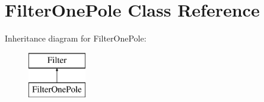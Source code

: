 \hypertarget{class_filter_one_pole}{\section{Filter\-One\-Pole Class Reference}
\label{class_filter_one_pole}
}
Inheritance diagram for Filter\-One\-Pole\-:\begin{figure}[H]
\begin{center}
\leavevmode
\includegraphics[height=2.000000cm]{class_filter_one_pole}
\end{center}
\end{figure}
